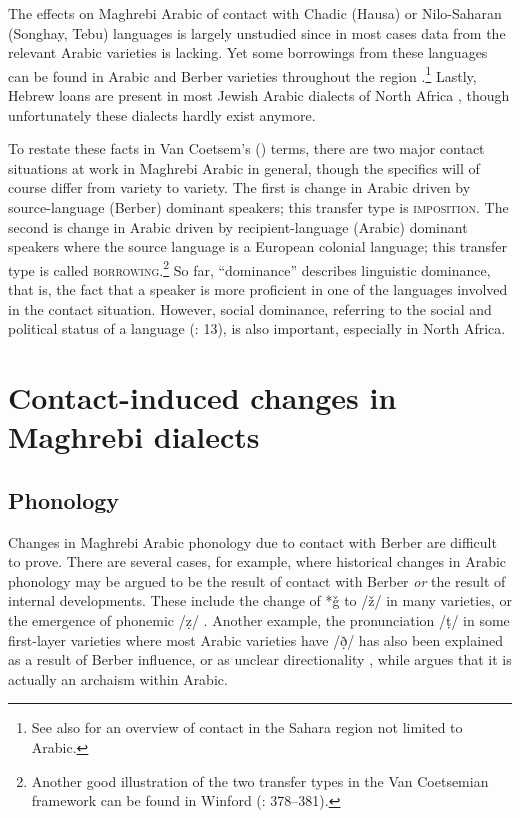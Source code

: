 \documentclass[output=paper]{langsci/langscibook}
\begin{document}
  The effects on Maghrebi Arabic of contact with Chadic (Hausa) or Nilo-Saharan (Songhay, Tebu) languages is largely unstudied since in most cases data from the relevant Arabic varieties is lacking. Yet some borrowings from these languages can be found in Arabic and Berber varieties throughout the region \citep{Souag2013lexical}.\footnote{See also \citet{Souag2016sahara} for an overview of contact in the Sahara region not limited to Arabic.} Lastly, Hebrew loans are present in most Jewish Arabic dialects of North Africa \citep{Yoda2013}, though unfortunately these dialects hardly exist anymore.

  To restate these facts in Van Coetsem’s (\citeyear{VanCoetsem1988,VanCoetsem2000}) terms, there are two major contact situations at work in Maghrebi Arabic in general, though the specifics will of course differ from variety to variety. The first is change in Arabic driven by source-language (Berber) dominant speakers; this transfer type is \textsc{imposition}. The second is change in Arabic driven by recipient-language (Arabic) dominant speakers where the source language is a European colonial language; this transfer type is called \textsc{borrowing}.\footnote{Another good illustration of the two transfer types in the Van Coetsemian framework can be found in Winford (\citeyear{Winford2005}: 378–381).} So far, ``dominance'' describes linguistic dominance, that is, the fact that a speaker is more proficient in one of the languages involved in the contact situation. However, social dominance, referring to the social and political status of a language (\citealt{VanCoetsem1988}: 13), is also important, especially in North Africa.

\section{ Contact-induced changes in Maghrebi dialects}

\subsection{ Phonology}

Changes in Maghrebi Arabic phonology due to contact with Berber are difficult to prove. There are several cases, for example, where historical changes in Arabic phonology may be argued to be the result of contact with Berber \textit{or} the result of internal developments. These include the change of *ǧ to /ž/ in many varieties, or the emergence of phonemic /ẓ/ \citep{Souag2016sahara}. Another example, the pronunciation /ṭ/ in some first-layer varieties where most Arabic varieties have /ð̣/ has also been explained as a result of Berber influence, or as unclear directionality \citep[187]{Kossmann2013book}, while \citet{Al-Jallad2015Maghreb} argues that it is actually an archaism within Arabic.
\end{document}
